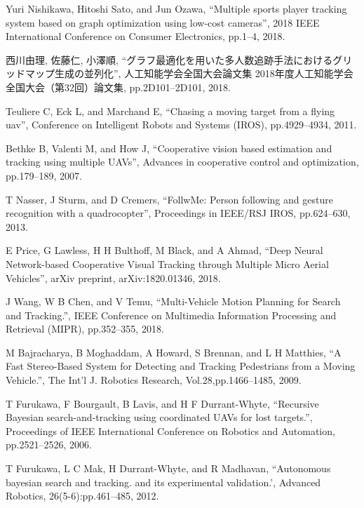 \documentclass[autodetect-engine,dvipdfmx-if-dvi,ja=standard,a4j,jbase=11pt,magstyle=nomag*]{bxjsreport}
\begin{document}
% 
% 

\begin{thebibliography}{99}

Yuri Nishikawa, Hitoshi Sato, and Jun Ozawa, ``Multiple sports player tracking system based on graph optimization using low-cost cameras'', 2018 IEEE International Conference on Consumer Electronics, pp.1--4, 2018.

西川由理, 佐藤仁, 小澤順,  ``グラフ最適化を用いた多人数追跡手法におけるグリッドマップ生成の並列化'', 人工知能学会全国大会論文集 2018年度人工知能学会全国大会（第32回）論文集, pp.2D101--2D101, 2018.

Teuliere C, Eck L, and Marchand E, ``Chasing a moving target from a flying uav'', Conference on Intelligent Robots and Systems (IROS), pp.4929--4934, 2011.

Bethke B, Valenti M, and How J, ``Cooperative vision based estimation and tracking using multiple UAVs'', Advances in cooperative control and optimization, pp.179--189, 2007.

T Nasser, J Sturm, and D Cremers, ``FollwMe: Person following and gesture recognition with a quadrocopter'', Proceedings in IEEE/RSJ IROS, pp.624--630, 2013.

E Price, G Lawless, H H Bulthoff, M Black, and A Ahmad, ``Deep Neural Network-based Cooperative Visual Tracking through Multiple Micro Aerial Vehicles'', arXiv preprint, arXiv:1820.01346, 2018.

J Wang, W B Chen, and V Temu, ``Multi-Vehicle Motion Planning for Search and Tracking.'', IEEE Conference on Multimedia Information Processing and Retrieval (MIPR), pp.352--355, 2018.

M Bajracharya, B Moghaddam, A Howard, S Brennan, and L H Matthies, ``A Fast Stereo-Based System for Detecting and Tracking Pedestrians from a Moving Vehicle.'', The Int'l J. Robotics Research, Vol.28,pp.1466--1485, 2009.

T Furukawa, F Bourgault, B Lavis, and H F Durrant-Whyte, ``Recursive Bayesian search-and-tracking using coordinated UAVs for lost targets.'', Proceedings of IEEE International Conference on Robotics and Automation, pp.2521--2526, 2006.

T Furukawa, L C Mak, H Durrant-Whyte, and R Madhavan, ``Autonomous bayesian search and tracking. and its experimental validation.', Advanced Robotics, 26(5-6):pp.461--485, 2012.


\end{thebibliography}
\end{document}
